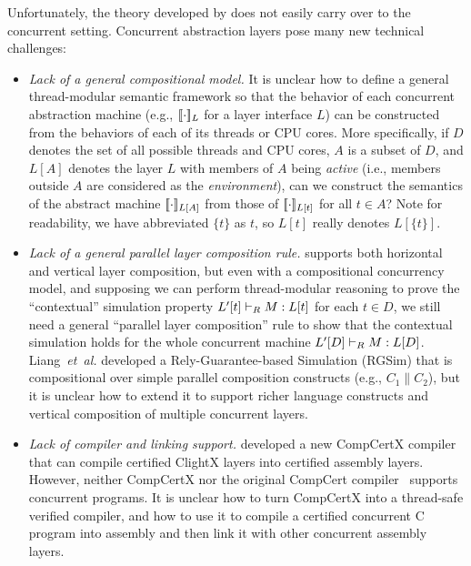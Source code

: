 Unfortunately, the theory developed by \citet{dscal15} does not easily
carry over to the concurrent setting. Concurrent abstraction layers
pose many new technical challenges:
\begin{itemize} \itemsep 0pt
\item 
  {\em Lack of a general compositional model.} It is unclear how to
  define a general thread-modular semantic framework so that the
  behavior of each concurrent abstraction machine (e.g.,
  $[\![\cdot]\!]_{L}$ for a layer interface $L$) can be constructed from the
  behaviors of each of its threads or CPU cores. More specifically, if
  $D$ denotes the set of all possible threads and CPU cores, $A$ is a
  subset of $D$, and $L[A]$ denotes the layer $L$ with members of $A$
  being {\em active} (i.e., members outside $A$ are considered as the
  {\em environment}), can we construct the semantics of the abstract
  machine $[\![\cdot]\!]_{L[A]}$ from those of $[\![\cdot]\!]_{L[t]}$
  for all $t\in{}A$? Note for readability, we have abbreviated
  $\{t\}$ as $t$, so $L[t]$ really denotes $L[\{t\}]$.
\item {\em Lack of a general parallel layer composition rule.}
  \citet{dscal15} supports both horizontal and vertical layer
  composition, but even with a compositional concurrency model, and
  supposing we can perform thread-modular reasoning to prove the
  ``contextual'' simulation property $L'[t] \vdash_{R} M : L[t]$ for
  each $t\in{}D$, we still need a general ``parallel layer composition''
  rule to show that the contextual simulation holds for the whole
  concurrent machine $L'[D] \vdash_{R} M : L[D]$.
  Liang~{\em{}et~al.}\cite{RGSim,Liang14lics,lili16} developed a
  Rely-Guarantee-based Simulation (RGSim) that is compositional over
  simple parallel composition constructs (e.g., $C_1 \| C_2$), but
  it is unclear how to extend it to support richer language constructs
  and vertical composition of multiple concurrent layers.
\item {\em Lack of compiler and linking support.} \citet{dscal15}
  developed a new CompCertX compiler that can compile certified
  ClightX layers into certified assembly layers. However, neither
  CompCertX nor the original CompCert compiler~\cite{leroy08} supports
  concurrent programs. It is unclear how to turn CompCertX into a
  thread-safe verified compiler, and how to use it to compile a
  certified concurrent C program into assembly and then link it with
  other concurrent assembly layers.
\end{itemize}

